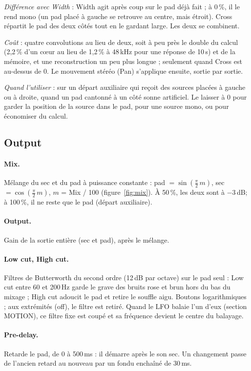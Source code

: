 \documentclass[a4paper,11pt]{article}
\newcommand{\dB}{\,dB}
\begin{document}
\emph{Différence avec Width} : Width agit après coup sur le pad déjà fait ; à 0\,\%, il le rend
mono (un pad placé à gauche se retrouve au centre, mais étroit). Cross répartit le pad des deux
côtés tout en le gardant large. Les deux se combinent.

\emph{Coût} : quatre convolutions au lieu de deux, soit à peu près le double du calcul (2,2\,\%
d'un cœur au lieu de 1,2\,\% à 48\,kHz pour une réponse de 10\,s) et de la mémoire, et une
reconstruction un peu plus longue ; seulement quand Cross est au-dessus de 0. Le mouvement stéréo
(Pan) s'applique ensuite, sortie par sortie.

\emph{Quand l'utiliser} : sur un départ auxiliaire qui reçoit des sources placées à gauche ou à
droite, quand un pad cantonné à un côté sonne artificiel. Le laisser à 0 pour garder la position
de la source dans le pad, pour une source mono, ou pour économiser du calcul.

\subsection{Output}

\paragraph{Mix.} Mélange du sec et du pad à puissance constante : pad $= \sin(\frac{\pi}{2}\,m)$,
sec $= \cos(\frac{\pi}{2}\,m)$, $m$ = Mix / 100 (figure~\ref{fig:mix}). À 50\,\%, les deux sont à
$-3$\dB ; à 100\,\%, il ne reste que le pad (départ auxiliaire).

\paragraph{Output.} Gain de la sortie entière (sec et pad), après le mélange.

\paragraph{Low cut, High cut.} Filtres de Butterworth du second ordre (12\dB{} par octave) sur le
pad seul : Low cut entre 60 et 200\,Hz garde le grave des bruits rose et brun hors du bas du
mixage ; High cut adoucit le pad et retire le souffle aigu. Boutons logarithmiques ; aux
extrémités (\og off\fg), le filtre est retiré. Quand le LFO balaie l'un d'eux (section MOTION),
ce filtre fixe est coupé et sa fréquence devient le centre du balayage.

\paragraph{Pre-delay.} Retarde le pad, de 0 à 500\,ms : il démarre après le son sec. Un changement
passe de l'ancien retard au nouveau par un fondu enchaîné de 30\,ms.
\end{document}
